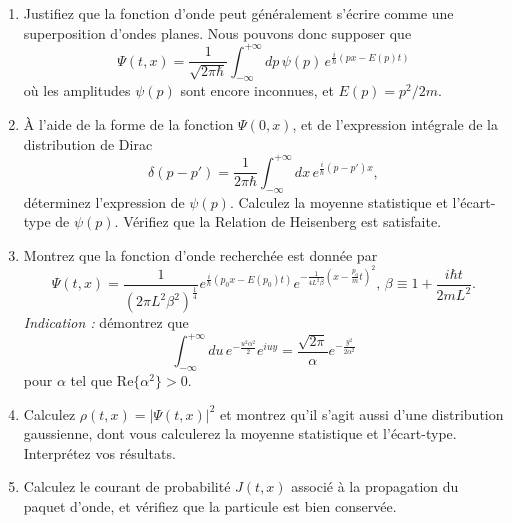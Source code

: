 \begin{enumerate}
\item Justifiez que la fonction d'onde peut généralement s'écrire comme une superposition d'ondes planes. Nous pouvons donc supposer que
\begin{equation}
\Psi(t,x) = \frac{1}{\sqrt{2\pi\hbar}} \int_{-\infty}^{+\infty} dp \, \psi(p) \, e^{\frac{i}{\hbar} (px - E(p) t)} 
\end{equation}
où les amplitudes $\psi(p)$ sont encore inconnues, et $E(p) = p^2/2m$. 
\item À l'aide de la forme de la fonction $\Psi(0,x)$, et de l'expression intégrale de la distribution de Dirac
\begin{equation}
\delta(p-p') = \frac{1}{2\pi\hbar} \int_{-\infty}^{+\infty} dx \, e^{\frac{i}{\hbar} (p-p')x},
\end{equation}
déterminez l'expression de $\psi(p)$. Calculez la moyenne statistique et l'écart-type de $\psi(p)$. Vérifiez que la Relation de Heisenberg est satisfaite.
\item Montrez que la fonction d'onde recherchée est donnée par
\begin{equation}
\Psi(t,x) = \frac{1}{(2\pi L^2 \beta^2)^{\frac{1}{4}} } e^{\frac{i}{\hbar}(p_0 x - E(p_0)t)} e^{-\frac{1}{4L^2\beta} (x - \frac{p_0}{m}t)^2}, \, \beta \equiv 1 + \frac{i\hbar t}{2mL^2}.
\end{equation}
\textit{Indication :} démontrez que
\begin{equation}
\int_{-\infty}^{+\infty} du \, e^{-\frac{u^2\alpha^2}{2}} e^{iuy} = \frac{\sqrt{2\pi}}{\alpha} e^{-\frac{y^2}{2\alpha^2}}
\end{equation}
pour $\alpha$ tel que $\text{Re}\lbrace \alpha^2\rbrace > 0$.
\item Calculez $\rho(t,x) = |\Psi(t,x)|^2$ et montrez qu'il s'agit aussi d'une distribution gaussienne, dont vous calculerez la moyenne statistique et l'écart-type. Interprétez vos résultats.
\item Calculez le courant de probabilité $J(t,x)$ associé à la propagation du paquet d'onde, et vérifiez que la particule est bien conservée.
\end{enumerate}

